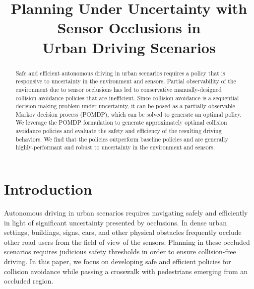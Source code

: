 \documentclass[conference]{IEEEtran}
\begin{document}
\title{\LARGE \textbf{Planning Under Uncertainty with Sensor Occlusions in \\ Urban Driving Scenarios} %
}


\author{
} %


\maketitle

\begin{abstract}
    Safe and efficient autonomous driving in urban scenarios requires a policy that is responsive to uncertainty in the environment and sensors. Partial observability of the environment due to sensor occlusions has led to conservative manually-designed collision avoidance policies that are inefficient. Since collision avoidance is a sequential decision-making problem under uncertainty, it can be posed as a partially observable Markov decision process (POMDP), which can be solved to generate an optimal policy. We leverage the POMDP formulation to generate approximately optimal collision avoidance policies and evaluate the safety and efficiency of the resulting driving behaviors. We find that the policies outperform baseline policies and are generally highly-performant and robust to uncertainty in the environment and sensors.
\end{abstract}


\section{Introduction}
\label{sec:introduction}

Autonomous driving in urban scenarios requires navigating safely and efficiently in light of significant uncertainty presented by occlusions. In dense urban settings, buildings, signs, cars, and other physical obstacles frequently occlude other road users from the field of view of the sensors. Planning in these occluded scenarios requires judicious safety thresholds in order to ensure collision-free driving. In this paper, we focus on developing safe and efficient policies for collision avoidance while passing a crosswalk with pedestrians emerging from an occluded region.
\end{document}
